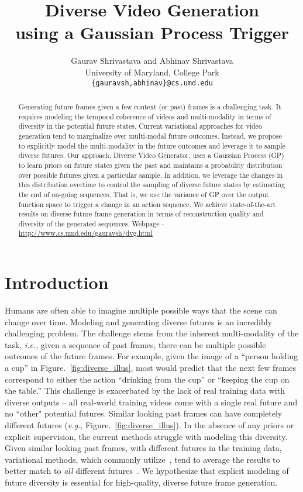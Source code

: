 \documentclass{article} \usepackage{iclr2021_conference,times}
\title{Diverse Video Generation\\
using a Gaussian Process Trigger}
\author{Gaurav Shrivastava and Abhinav Shrivastava \\
University of Maryland, College Park\\
\texttt{\{gauravsh,abhinav\}@cs.umd.edu} \\
}
\def\eg{\emph{e.g.}}
\def\ie{\emph{i.e.}}
\begin{document}
\maketitle

\begin{abstract}
Generating future frames given a few context (or past) frames is a challenging task. It requires modeling the temporal coherence of videos and multi-modality in terms of diversity in the potential future states. Current variational approaches for video generation tend to marginalize over multi-modal future outcomes. Instead, we propose to explicitly model the multi-modality in the future outcomes and leverage it to sample diverse futures. Our approach, Diverse Video Generator, uses a Gaussian Process (GP) to learn priors on future states given the past and maintains a probability distribution over possible futures given a particular sample. In addition, we leverage the changes in this distribution overtime to control the sampling of diverse future states by estimating the end of on-going sequences. That is, we use the variance of GP over the output function space to trigger a change in an action sequence. We achieve state-of-the-art results on diverse future frame generation in terms of reconstruction quality and diversity of the generated sequences. Webpage - \href{http://www.cs.umd.edu/~gauravsh/dvg.html}{http://www.cs.umd.edu/gauravsh/dvg.html}
\end{abstract}

\section{Introduction}

Humans are often able to imagine multiple possible ways that the scene can change over time. Modeling and generating diverse futures is an incredibly challenging problem. The challenge stems from the inherent multi-modality of the task, \ie, given a sequence of past frames, there can be multiple possible outcomes of the future frames. For example, given the image of a ``person holding a cup'' in Figure.~\ref{fig:diverse_illus}, most would predict that the next few frames correspond to either the action ``drinking from the cup'' or ``keeping the cup on the table.'' This challenge is exacerbated by the lack of real training data with diverse outputs -- all real-world training videos come with a single real future and no ``other" potential futures. Similar looking past frames can have completely different futures (\eg, Figure.~\ref{fig:diverse_illus}). In the absence of any priors or explicit supervision, the current methods struggle with modeling this diversity. Given similar looking past frames, with different futures in the training data, variational methods, which commonly utilize~\citep{Kingma2013AutoEncodingVB}, tend to average the results to better match to \emph{all} different futures~\citep{denton2018stochastic,babaeizadeh2017stochastic,Gao2018DisentanglingPA,lee2018savp,Oliu:2017}. We hypothesize that explicit modeling of future diversity is essential for high-quality, diverse future frame generation.
\end{document}
